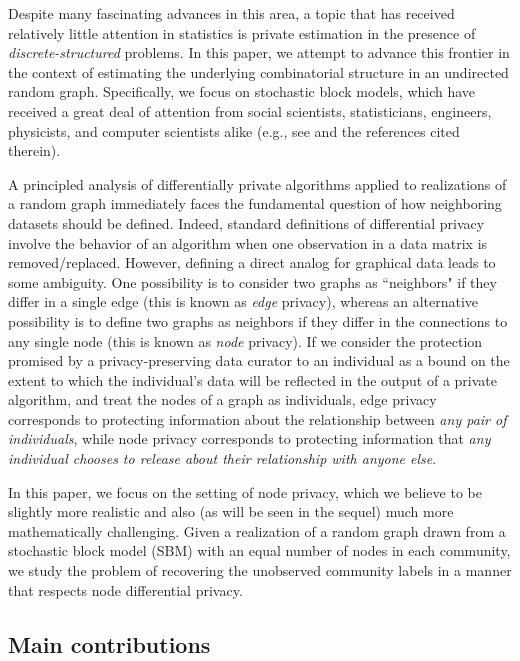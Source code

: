 \documentclass{article}
\begin{document}
Despite many fascinating advances in this area, a topic that has received relatively little attention in statistics is private estimation in the presence of \emph{discrete-structured} problems. In this paper, we attempt to advance this frontier in the context of estimating the underlying combinatorial structure in an undirected random graph. Specifically, we focus on stochastic block models, which have received a great deal of attention from social scientists, statisticians, engineers, physicists, and computer scientists alike (e.g., see \cite{holland1983stochastic, rohe2011spectral, decelle2011asymptotic, zhao2012consistency, LeiRin15, hajek2016achieving, moitra2016robust,  gao2017achieving, abbe2018community, xu2020optimal} and the references cited therein).

A principled analysis of differentially private algorithms applied to realizations of a random graph immediately faces the fundamental question of how neighboring datasets should be defined. Indeed, standard definitions of differential privacy involve the behavior of an algorithm when one observation in a data matrix is removed/replaced. However, defining a direct analog for graphical data leads to some ambiguity. One possibility is to consider two graphs as ``neighbors" if they differ in a single edge (this is known as \emph{edge} privacy), whereas an alternative possibility is to define two graphs as neighbors if they differ in the connections to any single node (this is known as \emph{node} privacy). If we consider the protection promised by a privacy-preserving data curator to an individual as a bound on the extent to which the individual's data will be reflected in the output of a private algorithm, and treat the nodes of a graph as individuals, edge privacy corresponds to protecting information about the relationship between \emph{any pair of individuals}, while node privacy corresponds to protecting information that \emph{any individual chooses to release about their relationship with anyone else}.

In this paper, we focus on the setting of node privacy, which we believe to be slightly more realistic and also (as will be seen in the sequel) much more mathematically challenging. Given a realization of a random graph drawn from a stochastic block model (SBM) with an equal number of nodes in each community, we study the problem of recovering the unobserved community labels in a manner that respects node differential privacy.


\subsection{Main contributions}
\end{document}
